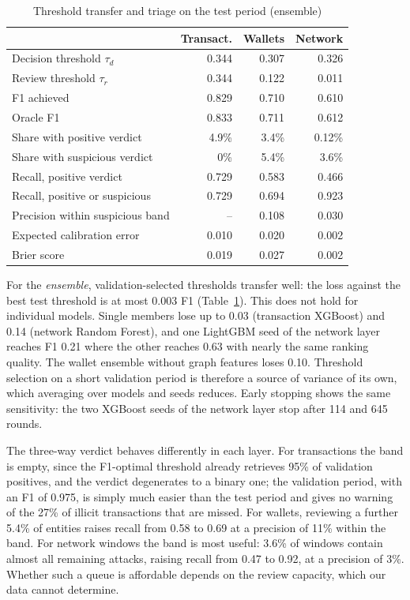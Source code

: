 \begin{table}[t]
\caption{Threshold transfer and triage on the test period (ensemble)}\label{tab:verdict}
\centering
\setlength{\tabcolsep}{3pt}
\begin{tabular}{lrrr}
\toprule
 & Transact. & Wallets & Network \\
\midrule
Decision threshold $\tau_d$ & 0.344 & 0.307 & 0.326 \\
Review threshold $\tau_r$ & 0.344 & 0.122 & 0.011 \\
F1 achieved & 0.829 & 0.710 & 0.610 \\
Oracle F1 & 0.833 & 0.711 & 0.612 \\
\midrule
Share with positive verdict & 4.9\% & 3.4\% & 0.12\% \\
Share with suspicious verdict & 0\% & 5.4\% & 3.6\% \\
Recall, positive verdict & 0.729 & 0.583 & 0.466 \\
Recall, positive or suspicious & 0.729 & 0.694 & 0.923 \\
Precision within suspicious band & -- & 0.108 & 0.030 \\
\midrule
Expected calibration error & 0.010 & 0.020 & 0.002 \\
Brier score & 0.019 & 0.027 & 0.002 \\
\bottomrule
\end{tabular}
\end{table}

For the \emph{ensemble}, validation-selected thresholds transfer well: the loss against the best test threshold is at most 0.003 F1 (Table~\ref{tab:verdict}). This does not hold for individual models. Single members lose up to 0.03 (transaction XGBoost) and 0.14 (network Random Forest), and one LightGBM seed of the network layer reaches F1 0.21 where the other reaches 0.63 with nearly the same ranking quality. The wallet ensemble without graph features loses 0.10. Threshold selection on a short validation period is therefore a source of variance of its own, which averaging over models and seeds reduces. Early stopping shows the same sensitivity: the two XGBoost seeds of the network layer stop after 114 and 645 rounds.

The three-way verdict behaves differently in each layer. For transactions the band is empty, since the F1-optimal threshold already retrieves 95\% of validation positives, and the verdict degenerates to a binary one; the validation period, with an F1 of 0.975, is simply much easier than the test period and gives no warning of the 27\% of illicit transactions that are missed. For wallets, reviewing a further 5.4\% of entities raises recall from 0.58 to 0.69 at a precision of 11\% within the band. For network windows the band is most useful: 3.6\% of windows contain almost all remaining attacks, raising recall from 0.47 to 0.92, at a precision of 3\%. Whether such a queue is affordable depends on the review capacity, which our data cannot determine.

